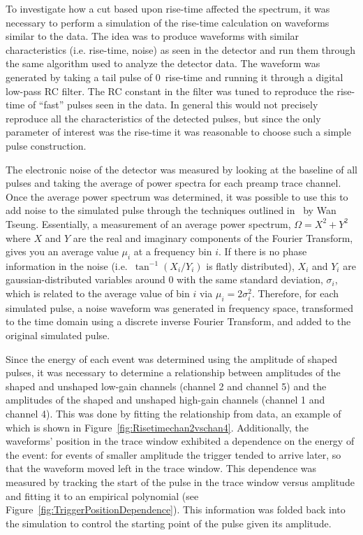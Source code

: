 	To investigate how a cut based upon rise-time affected the spectrum, it was necessary to perform a simulation of the rise-time calculation on waveforms similar to the data.  The idea was to produce waveforms with similar characteristics (i.e. rise-time, noise) as seen in the detector and run them through the same algorithm used to analyze the detector data.  The waveform was generated by taking a tail pulse of 0~rise-time and running it through a digital low-pass RC filter.  The RC constant in the filter was tuned to reproduce the rise-time of ``fast'' pulses seen in the data.  In general this would not precisely reproduce all the characteristics of the detected pulses, but since the only parameter of interest was the rise-time it was reasonable to choose such a simple pulse construction.  
	
	The electronic noise of the detector was measured by looking at the baseline of all pulses and taking the average of power spectra for each preamp trace channel.  Once the average power spectrum was determined, it was possible to use this to add noise to the simulated pulse through the techniques outlined in~\cite{WanThesis08} by Wan Tseung.  Essentially, a measurement of an average power spectrum, $\Omega = X^{2} + Y^{2}$ where $X$ and $Y$ are the real and imaginary components of the Fourier Transform, gives you an average value $\mu_{i}$ at a frequency bin $i$.  If there is no phase information in the noise (i.e.~$\tan^{-1} (X_{i}/Y_{i})$ is flatly distributed), $X_{i}$ and $Y_{i}$ are gaussian-distributed variables around 0 with the same standard deviation, $\sigma_{i}$, which is related to the average value of bin $i$ via  $\mu_{i} = 2 \sigma_{i}^{2}$.  Therefore, for each simulated pulse, a noise waveform was generated in frequency space, transformed to the time domain using a discrete inverse Fourier Transform, and added to the original simulated pulse.  
	
	Since the energy of each event was determined using the amplitude of shaped pulses, it was necessary to determine a relationship between amplitudes of the shaped and unshaped low-gain channels (channel 2 and channel 5) and the amplitudes of the shaped and unshaped high-gain channels (channel 1 and channel 4).  This was done by fitting the relationship from data, an example of which is shown in Figure~\ref{fig:Risetimechan2vschan4}.  Additionally, the waveforms' position in the trace window exhibited a dependence on the energy of the event: for events of smaller amplitude the trigger tended to arrive later, so that the waveform moved left in the trace window.  This dependence was measured by tracking the start of the pulse in the trace window versus amplitude and fitting it to an empirical polynomial (see Figure~\ref{fig:TriggerPositionDependence}).  This information was folded back into the simulation to control the starting point of the pulse given its amplitude.
	
